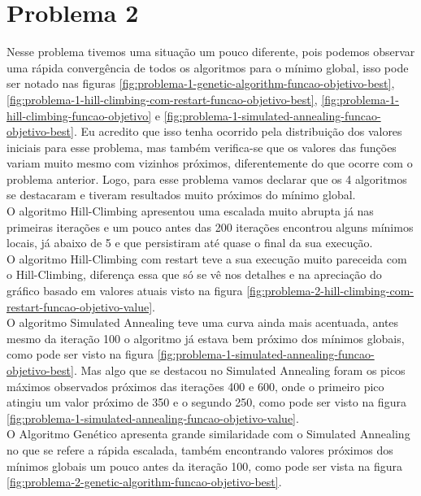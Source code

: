 \section[Problema 2]{Problema 2}

Nesse problema tivemos uma situação um pouco diferente, pois podemos observar uma rápida convergência de todos os algoritmos para o mínimo global, isso pode ser notado nas figuras \ref{fig:problema-1-genetic-algorithm-funcao-objetivo-best}, \ref{fig:problema-1-hill-climbing-com-restart-funcao-objetivo-best}, \ref{fig:problema-1-hill-climbing-funcao-objetivo} e \ref{fig:problema-1-simulated-annealing-funcao-objetivo-best}. Eu acredito que isso tenha ocorrido pela distribuição dos valores iniciais para esse problema, mas também verifica-se que os valores das funções variam muito mesmo com vizinhos próximos, diferentemente do que ocorre com o problema anterior. Logo, para esse problema vamos declarar que os 4 algoritmos se destacaram e tiveram resultados muito próximos do mínimo global. \\

O algoritmo Hill-Climbing apresentou uma escalada muito abrupta já nas primeiras iterações e um pouco antes das 200 iterações encontrou alguns mínimos locais, já abaixo de 5 e que persistiram até quase o final da sua execução. \\

O algoritmo Hill-Climbing com restart teve a sua execução muito pareceida com o Hill-Climbing, diferença essa que só se vê nos detalhes e na apreciação do gráfico basado em valores atuais visto na figura \ref{fig:problema-2-hill-climbing-com-restart-funcao-objetivo-value}. \\

O algoritmo Simulated Annealing teve uma curva ainda mais acentuada, antes mesmo da iteração 100 o algoritmo já estava bem próximo dos mínimos globais, como pode ser visto na figura \ref{fig:problema-1-simulated-annealing-funcao-objetivo-best}. Mas algo que se destacou no Simulated Annealing foram os picos máximos observados próximos das iterações 400 e 600, onde o primeiro pico atingiu um valor próximo de 350 e o segundo 250, como pode ser visto na figura \ref{fig:problema-1-simulated-annealing-funcao-objetivo-value}. \\

O Algoritmo Genético apresenta grande similaridade com o Simulated Annealing no que se refere a rápida escalada, também encontrando valores próximos dos mínimos globais um pouco antes da iteração 100, como pode ser vista na figura \ref{fig:problema-2-genetic-algorithm-funcao-objetivo-best}.

